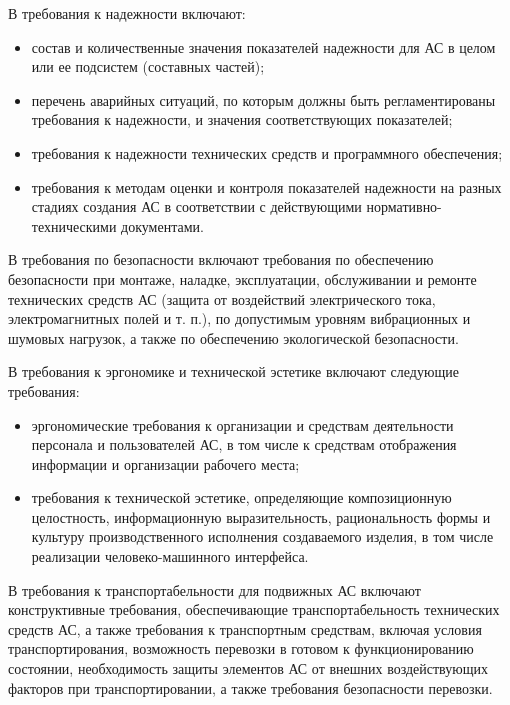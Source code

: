 {В требования к надежности включают:
\begin{itemize}
  \item состав и количественные значения показателей надежности для АС в целом или ее подсистем (составных частей);
  \item перечень аварийных ситуаций, по которым должны быть регламентированы требования к надежности, и значения соответствующих показателей;
  \item требования к надежности технических средств и программного обеспечения;
  \item требования к методам оценки и контроля показателей надежности на разных стадиях создания АС в соответствии с действующими нормативно-техническими документами.
\end{itemize}
В требования по безопасности включают требования по обеспечению безопасности при монтаже, наладке, эксплуатации, обслуживании и ремонте технических средств АС (защита от воздействий электрического тока, электромагнитных полей и т. п.), по допустимым уровням вибрационных и шумовых нагрузок, а также по обеспечению экологической безопасности.

В требования к эргономике и технической эстетике включают следующие требования:
\begin{itemize}
  \item эргономические требования к организации и средствам деятельности персонала и пользователей АС, в том числе к средствам отображения информации и организации рабочего места;
  \item требования к технической эстетике, определяющие композиционную целостность, информационную выразительность, рациональность формы и культуру производственного исполнения создаваемого изделия, в том числе реализации человеко-машинного интерфейса.
\end{itemize}
В требования к транспортабельности для подвижных АС включают конструктивные требования, обеспечивающие транспортабельность технических средств АС, а также требования к транспортным средствам, включая условия транспортирования, возможность перевозки в готовом к функционированию состоянии, необходимость защиты элементов АС от внешних воздействующих факторов при транспортировании, а также требования безопасности перевозки.

}

